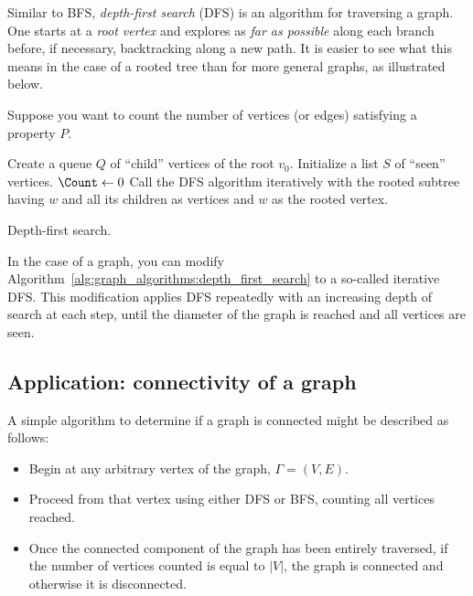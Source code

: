Similar to BFS, \emph{depth-first search} (DFS) is an algorithm for
traversing a graph. One starts at a \emph{root vertex} and explores as
\emph{far as possible} along each branch before, if necessary,
backtracking along a new path. It is easier to see what this means in
the case of a rooted tree than for more general graphs, as illustrated
below.

Suppose you want to count the number of vertices (or edges) satisfying
a property $P$.

\begin{algorithm}[!htpb]
\dontprintsemicolon  %
\BlankLine
Create a queue $Q$ of ``child'' vertices of the root $v_0$.\;
Initialize a list $S$ of ``seen'' vertices.\;
$\Count \leftarrow 0$\;
Call the DFS algorithm iteratively with the rooted subtree having $w$
and all its children as vertices and $w$ as the rooted vertex.
\caption{Depth-first search.}
\label{alg:graph_algorithms:depth_first_search}
\end{algorithm}

In the case of a graph, you can modify
Algorithm~\ref{alg:graph_algorithms:depth_first_search} to a so-called
iterative DFS. This modification applies DFS repeatedly with an
increasing depth of search at each step, until the diameter of the
graph is reached and all vertices are seen.

\subsection{Application: connectivity of a graph}


A simple algorithm to determine if a graph is connected
might be described as follows:
\begin{itemize}

\item
Begin at any arbitrary vertex of the graph, $\Gamma=(V,E)$.

\item
Proceed from that vertex using either DFS or BFS, counting all
vertices reached.

\item
Once the connected component of the graph has been entirely traversed,
if the number of vertices counted is equal to $|V|$,
the graph is connected and otherwise it is disconnected.
\end{itemize}



